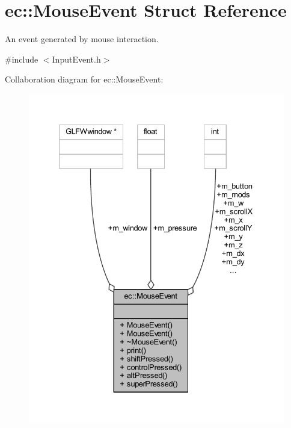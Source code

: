 \hypertarget{structec_1_1_mouse_event}{}\section{ec\+:\+:Mouse\+Event Struct Reference}
\label{structec_1_1_mouse_event}


An event generated by mouse interaction.  




{\ttfamily \#include $<$Input\+Event.\+h$>$}



Collaboration diagram for ec\+:\+:Mouse\+Event\+:\nopagebreak
\begin{figure}[H]
\begin{center}
\leavevmode
\includegraphics[width=333pt]{structec_1_1_mouse_event__coll__graph}
\end{center}
\end{figure}
